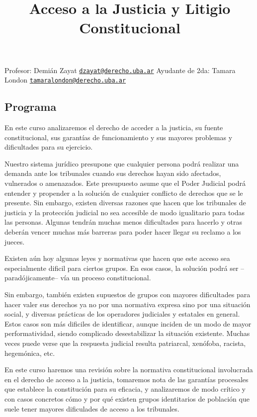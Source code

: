 \documentclass[
]{article}
\title{Acceso a la Justicia y Litigio Constitucional}
\author{}
\date{\vspace{-2.5em}}
\begin{document}
\maketitle

Profesor: Demián Zayat
\href{mailto:dzayat@derecho.uba.ar}{\nolinkurl{dzayat@derecho.uba.ar}}
Ayudante de 2da: Tamara London
\href{mailto:tamaralondon@derecho.uba.ar}{\nolinkurl{tamaralondon@derecho.uba.ar}}

\subsection{Programa}\label{programa}

En este curso analizaremos el derecho de acceder a la justicia, su
fuente constitucional, sus garantías de funcionamiento y sus mayores
problemas y dificultades para su ejercicio.

Nuestro sistema jurídico presupone que cualquier persona podrá realizar
una demanda ante los tribunales cuando sus derechos hayan sido
afectados, vulnerados o amenazados. Este presupuesto asume que el Poder
Judicial podrá entender y propender a la solución de cualquier conflicto
de derechos que se le presente. Sin embargo, existen diversas razones
que hacen que los tribunales de justicia y la protección judicial no sea
accesible de modo igualitario para todas las personas. Algunas tendrán
muchas menos dificultades para hacerlo y otras deberán vencer muchas más
barreras para poder hacer llegar su reclamo a los jueces.

Existen aún hoy algunas leyes y normativas que hacen que este acceso sea
especialmente dificil para ciertos grupos. En esos casos, la solución
podrá ser --paradójicamente-- vía un proceso constitucional.

Sin embargo, también existen supuestos de grupos con mayores
dificultades para hacer valer sus derechos ya no por una normativa
expresa sino por una situación social, y diversas prácticas de los
operadores judiciales y estatales en general. Estos casos son más
dificiles de identificar, aunque inciden de un modo de mayor
performatividad, siendo complicado desestabilizar la situación
existente. Muchas veces puede verse que la respuesta judicial resulta
patriarcal, xenófoba, racista, hegemónica, etc.

En este curso haremos una revisión sobre la normativa constitucional
involucrada en el derecho de acceso a la justicia, tomaremos nota de las
garantías procesales que establece la constitución para su eficacia, y
analizaremos de modo crítico y con casos concretos cómo y por qué
existen grupos identitarios de población que suele tener mayores
dificulades de acceso a los tribunales.
\end{document}

